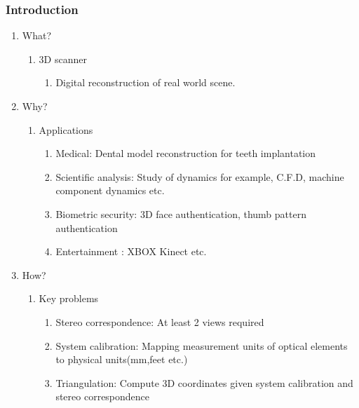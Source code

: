 \documentclass[9pt]{beamer}
\begin{document}
\begin{frame}
\frametitle{Introduction}
\begin{enumerate}
\item What?
\begin{enumerate}
\item 3D scanner
\begin{enumerate}
  \item Digital reconstruction of real world scene.
\end{enumerate}
\end{enumerate}

\item Why?
\begin{enumerate}
\item Applications
\begin{enumerate}
   \item Medical: Dental model reconstruction for teeth implantation
   \item Scientific analysis: Study of dynamics for example, C.F.D, machine component dynamics etc.
   \item Biometric security: 3D face authentication, thumb pattern authentication
   \item Entertainment : XBOX Kinect etc.
\end{enumerate}
\end{enumerate}

\item How?
\begin{enumerate}
\item Key problems
\begin{enumerate}
   \item Stereo correspondence: At least 2 views required
   \item System calibration: Mapping measurement units of optical elements to physical units(mm,feet etc.) 
   \item Triangulation: Compute 3D coordinates given system calibration and stereo correspondence
\end{enumerate}
\end{enumerate}
\end{enumerate}
\end{frame}
\end{document}
